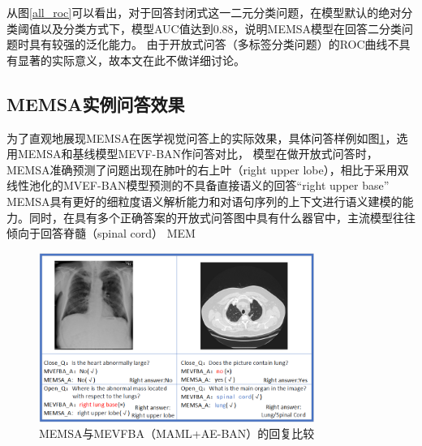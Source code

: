 
从图\ref{all_roc}可以看出，对于回答封闭式这一二元分类问题，在模型默认的绝对分类阈值以及分类方式下，模型AUC值达到0.88，说明MEMSA模型在回答二分类问题时具有较强的泛化能力。
由于开放式问答（多标签分类问题）的ROC曲线不具有显著的实际意义，故本文在此不做详细讨论。

\subsection{MEMSA实例问答效果}
为了直观地展现MEMSA在医学视觉问答上的实际效果，具体问答样例如图\ref{fig:qa_demo}，选用MEMSA和基线模型MEVF-BAN作问答对比，
模型在做开放式问答时，MEMSA准确预测了问题出现在肺叶的右上叶（right upper lobe），相比于采用双线性池化的MVEF-BAN模型预测的不具备直接语义的回答“right upper base”
MEMSA具有更好的细粒度语义解析能力和对语句序列的上下文进行语义建模的能力。同时，在具有多个正确答案的开放式问答图中具有什么器官中，主流模型往往倾向于回答脊髓（spinal cord）
MEM
\begin{figure}[htbp]
	\centering	
	\includegraphics[width=0.8\textwidth]{Fig/myfig/chapter3/qa_demo.png}  %
	\caption{\label{fig:qa_demo}MEMSA与MEVFBA（MAML+AE-BAN）的回复比较} 
\end{figure}


